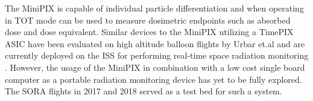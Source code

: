 %
%
%
%
The MiniPIX is capable of individual particle differentiation and when operating in TOT mode can be used to measure dosimetric endpoints such as absorbed dose and dose equivalent. Similar devices to the MiniPIX utilizing a TimePIX ASIC have been evaluated on high altitude balloon flights by Urbar et.al \cite{bexus} and are currently deployed on the ISS for performing real-time space radiation monitoring \cite{timepixiss}. However, the usage of the MiniPIX in combination with a low cost single board computer as a portable radiation monitoring device has yet to be fully explored. The SORA flights in 2017 and 2018 served as a test bed for such a system.

%

